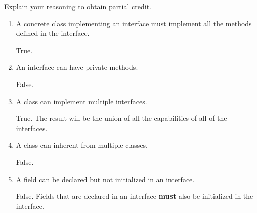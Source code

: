 \Instructions
   Explain your reasoning to obtain partial credit.
\begin{enumerate}
\vspace{2em}

\item {} \tf A concrete class implementing an interface must implement all the methods defined in the interface.

\Ans True. 

\vspace{3em}
\item {} \tf An interface can have private methods.

\Ans False.

\vspace{3em}

\item {} \tf A class can implement multiple interfaces.

\Ans True. The result will be the union of all the capabilities of all of the interfaces.

\vspace{3em}

\item {} \tf A class can inherent from multiple classes.

\Ans False.

\vspace{3em}

\item {} \tf A field can be declared but not initialized in an interface.

\Ans False. Fields that are declared in an interface  \textbf{must} also be initialized in the interface.

\vspace{3em}

\end{enumerate}   
